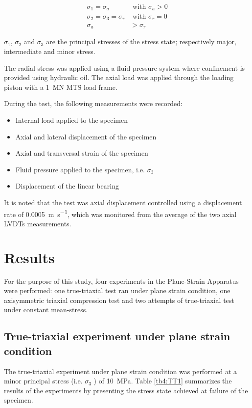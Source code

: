 \begin{align}
    \sigma_1 = \sigma_a &\text{ with } \sigma_a > 0 \\
    \sigma_2 = \sigma_3 = \sigma_r  &\text{ with } \sigma_r = 0 \\
    \sigma_a &> \sigma_r
\end{align}

$\sigma_1$, $\sigma_2$  and  $\sigma_3$  are the principal stresses of the stress state; respectively major, intermediate and minor stress.

The radial stress was applied using a fluid pressure system where confinement is provided using hydraulic oil. The axial load was applied through the loading piston with a \SI{1}{MN} MTS load frame. 

During the test, the following measurements were recorded: 

\begin{itemize}
    \item Internal load applied to the specimen 
    \item Axial and lateral displacement of the specimen 
    \item Axial and transversal strain of the specimen
    \item Fluid pressure applied to the specimen, i.e. $\sigma_3$
    \item Displacement of the linear bearing
\end{itemize}

It is noted that the test was axial displacement controlled using a displacement rate of \SI{0.0005}{\meter\per\second}, which was monitored from the average of the two axial LVDTs measurements. 

\section{Results}

For the purpose of this study, four experiments in the Plane-Strain Apparatus were performed: one true-triaxial test ran under plane strain condition, one axisymmetric triaxial compression test and two attempts of true-triaxial test under constant mean-stress. 

\subsection{True-triaxial experiment under plane strain condition}

The true-triaxial experiment under plane strain condition was performed at a minor principal stress (i.e. $\sigma_3$ ) of \SI{10}{MPa}. Table \ref{tb4:TT1} summarizes the results of the experiments by presenting the stress state achieved at failure of the specimen.

